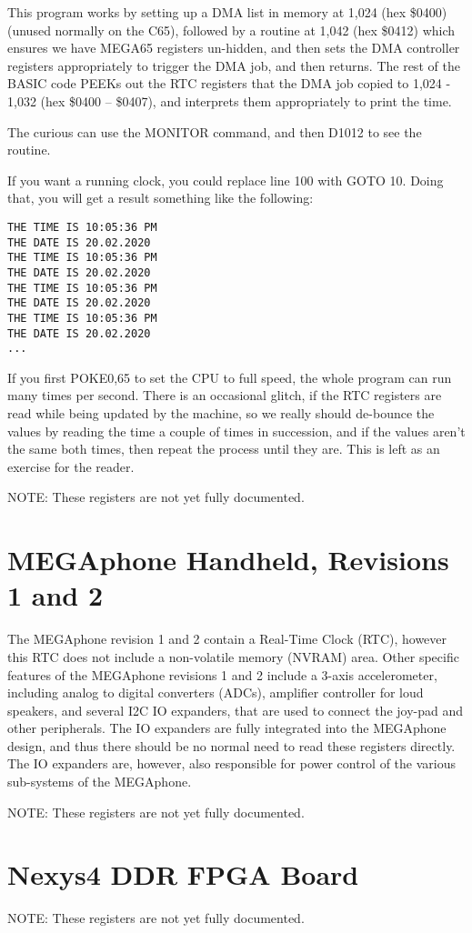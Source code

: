 This program works by setting up a DMA list in memory at 1,024 (hex \$0400) (unused normally on the C65), followed by a routine at 1,042 (hex \$0412) which ensures we have MEGA65 registers un-hidden, and then sets the DMA controller registers appropriately to trigger the DMA job, and then returns.  The rest of the BASIC code PEEKs out the RTC registers that the DMA job copied to 1,024 - 1,032 (hex \$0400 -- \$0407), and interprets them appropriately to print the time.

The curious can use the MONITOR command, and then D1012 to see the routine.

If you want a running clock, you could replace line 100 with GOTO 10.  Doing that, you will get a result something like the following:

\begin{tcolorbox}[colback=black,coltext=white]
\verbatimfont{\codefont}
\begin{verbatim}
THE TIME IS 10:05:36 PM
THE DATE IS 20.02.2020
THE TIME IS 10:05:36 PM
THE DATE IS 20.02.2020
THE TIME IS 10:05:36 PM
THE DATE IS 20.02.2020
THE TIME IS 10:05:36 PM
THE DATE IS 20.02.2020
...
\end{verbatim}
\end{tcolorbox}


If you first POKE0,65 to set the CPU to full speed, the whole program can run many times per second. There is an occasional glitch, if the RTC registers are read while being updated by the machine, so we really should de-bounce the values by reading the time a couple of times in succession, and if the values aren't the same both times, then repeat the process until they are. This is left as an exercise for the reader.

NOTE: These registers are not yet fully documented.


\section{MEGAphone Handheld, Revisions 1 and 2}

The MEGAphone revision 1 and 2 contain a Real-Time Clock (RTC), however this RTC does not include a non-volatile memory (NVRAM)
area.  Other specific features of the MEGAphone revisions 1 and 2 include a 3-axis accelerometer, including analog to digital
converters (ADCs), amplifier controller for loud speakers, and several I2C IO expanders, that are used to connect the joy-pad and other peripherals. The IO expanders are
fully integrated into the MEGAphone design, and thus there should be no normal need to read these registers directly.  The IO
expanders are, however, also responsible for power control of the various sub-systems of the MEGAphone.

NOTE: These registers are not yet fully documented.


\section{Nexys4 DDR FPGA Board}

NOTE: These registers are not yet fully documented.


